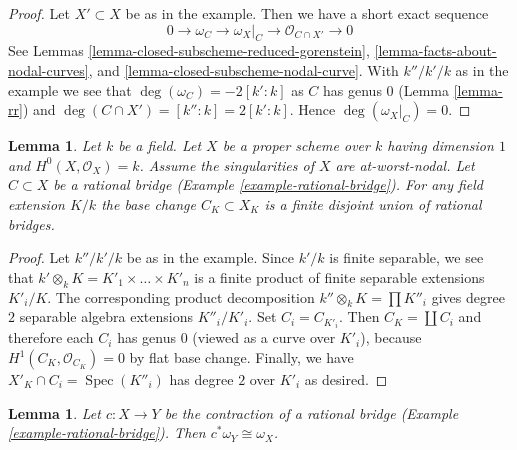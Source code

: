 \documentclass{stacks-project}
\theoremstyle{plain}
\newtheorem{lemma}[subsection]{Lemma}
\theoremstyle{definition}
\theoremstyle{remark}
\numberwithin{equation}{subsection}
\def\Spec{\mathop{\mathrm{Spec}}}
\begin{document}
\begin{proof}
Let $X' \subset X$ be as in the example. Then we have a short exact
sequence
$$
0 \to \omega_C \to \omega_X|_C \to \mathcal{O}_{C \cap X'} \to 0
$$
See Lemmas \ref{lemma-closed-subscheme-reduced-gorenstein},
\ref{lemma-facts-about-nodal-curves}, and
\ref{lemma-closed-subscheme-nodal-curve}.
With $k''/k'/k$ as in the example we see that
$\deg(\omega_C) = -2[k' : k]$ as $C$ has genus $0$
(Lemma \ref{lemma-rr})
and $\deg(C \cap X') = [k'' : k] = 2[k' : k]$.
Hence $\deg(\omega_X|_C) = 0$.
\end{proof}

\begin{lemma}
\label{lemma-rational-bridge-field-extension}
Let $k$ be a field. Let $X$ be a proper scheme over $k$ having dimension $1$
and $H^0(X, \mathcal{O}_X) = k$. Assume the singularities of $X$ are
at-worst-nodal. Let $C \subset X$ be a rational bridge
(Example \ref{example-rational-bridge}).
For any field extension $K/k$ the base change $C_K \subset X_K$
is a finite disjoint union of rational bridges.
\end{lemma}

\begin{proof}
Let $k''/k'/k$ be as in the example.
Since $k'/k$ is finite separable, we see that
$k' \otimes_k K = K'_1 \times \ldots \times K'_n$
is a finite product of finite separable extensions $K'_i/K$.
The corresponding product decomposition
$k'' \otimes_k K = \prod K''_i$ gives degree $2$
separable algebra extensions $K''_i/K'_i$.
Set $C_i = C_{K'_i}$. Then $C_K = \coprod C_i$
and therefore each $C_i$ has genus $0$ (viewed as a curve
over $K'_i$), because $H^1(C_K, \mathcal{O}_{C_K}) = 0$
by flat base change.
Finally, we have $X'_K \cap C_i = \Spec(K''_i)$ has degree $2$
over $K'_i$ as desired.
\end{proof}

\begin{lemma}
\label{lemma-rational-bridge-canonical}
Let $c : X \to Y$ be the contraction of a rational bridge
(Example \ref{example-rational-bridge}).
Then $c^*\omega_Y \cong \omega_X$.
\end{lemma}
\end{document}

